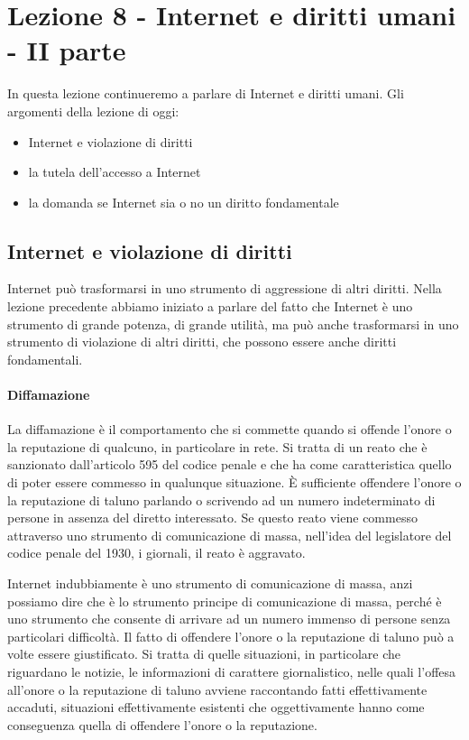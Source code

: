 \chapter{Lezione 8 -  Internet e diritti umani - II parte}

In questa lezione continueremo a parlare di Internet e diritti umani. Gli argomenti della lezione di oggi:
 \begin{itemize}
     \item Internet e violazione di diritti
     \item la tutela dell'accesso a Internet
     \item la domanda se Internet sia o no un diritto fondamentale
 \end{itemize}

\section{Internet e violazione di diritti}
 
 Internet può trasformarsi in uno strumento di aggressione di altri diritti. Nella lezione precedente abbiamo iniziato a parlare del fatto che Internet è uno strumento di grande potenza, di grande utilità, ma può anche trasformarsi in uno strumento di violazione di altri diritti, che possono essere anche diritti fondamentali.\par
 
 \subsubsection{Diffamazione}
 La diffamazione è il comportamento che si commette quando si offende l'onore o la reputazione di qualcuno, in particolare in rete. Si tratta di un reato che è sanzionato dall'articolo 595 del codice penale e che ha come caratteristica quello di poter essere commesso in qualunque situazione. È sufficiente offendere l'onore o la reputazione di taluno parlando o scrivendo ad un numero indeterminato di persone in assenza del diretto interessato. Se questo reato viene commesso attraverso uno strumento di comunicazione di massa, nell'idea del legislatore del codice penale del 1930, i giornali, il reato è aggravato.\par
 Internet indubbiamente è uno strumento di comunicazione di massa, anzi possiamo dire che è lo strumento principe di comunicazione di massa, perché è uno strumento che consente di arrivare ad un numero immenso di persone senza particolari difficoltà. Il fatto di offendere l'onore o la reputazione di taluno può a volte essere giustificato. Si tratta di quelle situazioni, in particolare che riguardano le notizie, le informazioni di carattere giornalistico, nelle quali l'offesa all'onore o la reputazione di taluno avviene raccontando fatti effettivamente accaduti, situazioni effettivamente esistenti che oggettivamente hanno come conseguenza quella di offendere l'onore o la reputazione. 
